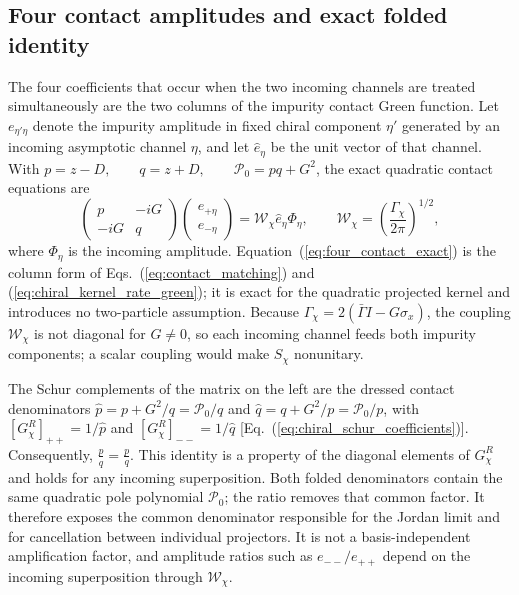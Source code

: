 \documentclass[%
  aps,physrev,onecolumn,10pt,amsmath,amssymb,superscriptaddress,longbibliography,floatfix
]{revtex4-2}
\begin{document}
\subsection{Four contact amplitudes and exact folded identity}
\label{app:four_contact_exact}

The four coefficients that occur when the two incoming channels are treated
simultaneously are the two columns of the impurity contact Green function.
Let $e_{\eta'\eta}$ denote the impurity amplitude in fixed chiral component
$\eta'$ generated by an incoming asymptotic channel $\eta$, and let
$\hat e_\eta$ be the unit vector of that channel.  With $p=z-D,\qquad q=z+D,\qquad \mathcal P_0=pq+G^2$,
the exact quadratic contact equations are
\begin{equation}
\begin{pmatrix}
p&-iG\\
-iG&q
\end{pmatrix}
\begin{pmatrix}
e_{+\eta}\\e_{-\eta}
\end{pmatrix}
=\mathcal W_\chi\hat e_\eta\Phi_\eta,
\qquad
\mathcal W_\chi=\left(\frac{\Gamma_\chi}{2\pi}\right)^{1/2},
\label{eq:four_contact_exact}
\end{equation}
where $\Phi_\eta$ is the incoming amplitude.
Equation~(\ref{eq:four_contact_exact}) is the column form of
Eqs.~(\ref{eq:contact_matching}) and (\ref{eq:chiral_kernel_rate_green}); it
is exact for the quadratic projected kernel and introduces no two-particle
assumption.  Because $\Gamma_\chi=2(\bar\Gamma I-G\sigma_x)$, the coupling
$\mathcal W_\chi$ is not diagonal for $G\neq0$, so each incoming channel
feeds both impurity components; a scalar coupling would make $S_\chi$
nonunitary.

The Schur complements of the matrix on the left are the dressed contact
denominators $\widehat p=p+G^2/q=\mathcal P_0/q$ and $\widehat q=q+G^2/p=\mathcal P_0/p$,
with $[G_\chi^R]_{++}=1/\widehat p$ and $[G_\chi^R]_{--}=1/\widehat q$
[Eq.~(\ref{eq:chiral_schur_coefficients})].  Consequently, $\frac{\widehat p}{\widehat q}=\frac{p}{q}$.
This identity is a property of the diagonal elements of $G_\chi^R$ and holds
for any incoming superposition.  Both folded denominators contain the same
quadratic pole polynomial $\mathcal P_0$; the ratio removes that common
factor.  It therefore exposes the common denominator responsible for the
Jordan limit and for cancellation between individual projectors.  It is not a
basis-independent amplification factor, and amplitude ratios such as
$e_{--}/e_{++}$ depend on the incoming superposition through
$\mathcal W_\chi$.
\end{document}

